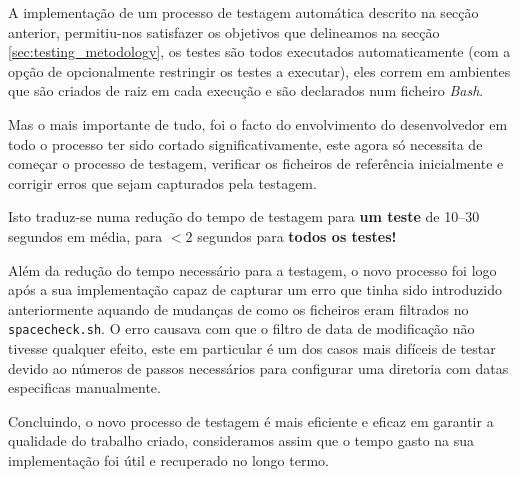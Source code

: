 A implementação de um processo de testagem automática descrito na secção
anterior, permitiu-nos satisfazer os objetivos que delineamos na secção
\ref{sec:testing_metodology}, os testes são todos executados automaticamente (com a
opção de opcionalmente restringir os testes a executar), eles correm em
ambientes que são criados de raiz em cada execução e são declarados num ficheiro
\emph{Bash}.

Mas o mais importante de tudo, foi o facto do envolvimento do desenvolvedor
em todo o processo ter sido cortado significativamente, este agora só necessita
de começar o processo de testagem, verificar os ficheiros de referência
inicialmente e corrigir erros que sejam capturados pela testagem.

Isto traduz-se numa redução do tempo de testagem para \textbf{um teste} de
\numrange{10}{30} segundos em média, para $< 2$ segundos para
\textbf{todos os testes!}

Além da redução do tempo necessário para a testagem, o novo processo foi logo
após a sua implementação capaz de capturar um erro que tinha sido introduzido
anteriormente aquando de mudanças de como os ficheiros eram filtrados no
\Verb|spacecheck.sh|. O erro
causava com que o filtro de data de modificação não tivesse qualquer efeito,
este em particular é um dos casos mais difíceis de testar devido ao números de
passos necessários para configurar uma diretoria com datas especificas manualmente.

Concluindo, o novo processo de testagem é mais eficiente e eficaz em garantir
a qualidade do trabalho criado, consideramos assim que o tempo gasto na sua
implementação foi útil e recuperado no longo termo.
